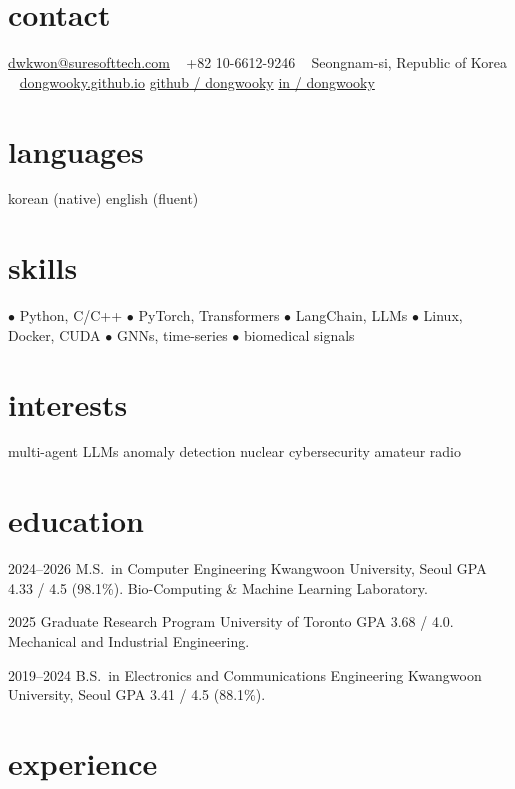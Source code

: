 \documentclass[]{cv-friggeri-x}
\begin{document}

\begin{aside}
\section{contact}
\href{mailto:dwkwon@suresofttech.com}{dwkwon@suresofttech.com}
~
+82 10-6612-9246
~
Seongnam-si, Republic of Korea
~
\href{https://dongwooky.github.io}{dongwooky.github.io}
\href{https://github.com/dongwooky}{github / dongwooky}
\href{https://linkedin.com/in/dongwooky}{in / dongwooky}
\section{languages}
korean (native)
english (fluent)
\section{skills}
{\color{red}$\bullet$} Python, C/C++
{\color{red}$\bullet$} PyTorch, Transformers
{\color{red}$\bullet$} LangChain, LLMs
{\color{red}$\bullet$} Linux, Docker, CUDA
{\color{red}$\bullet$} GNNs, time-series
{\color{red}$\bullet$} biomedical signals
\section{interests}
multi-agent LLMs
anomaly detection
nuclear cybersecurity
amateur radio
\end{aside}

\section{education}

\begin{entrylist}
\entry
  {2024--2026}
  {M.S.\ {\normalfont in Computer Engineering}}
  {Kwangwoon University, Seoul}
  {GPA 4.33 / 4.5 (98.1\%). Bio-Computing \& Machine Learning Laboratory.}

\entry
  {2025}
  {Graduate Research Program}
  {University of Toronto}
  {GPA 3.68 / 4.0. Mechanical and Industrial Engineering.}

\entry
  {2019--2024}
  {B.S.\ {\normalfont in Electronics and Communications Engineering}}
  {Kwangwoon University, Seoul}
  {GPA 3.41 / 4.5 (88.1\%).}

\end{entrylist}

\section{experience}
\end{document}
